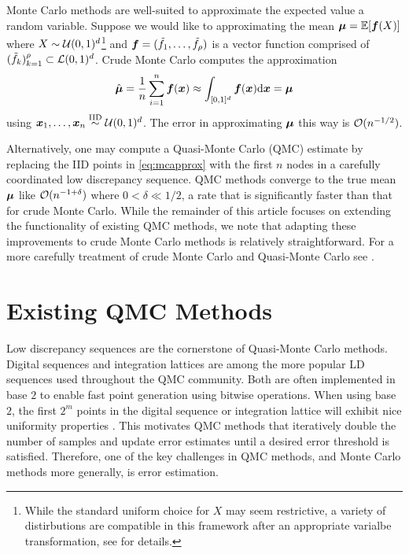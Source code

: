 \documentclass{article}[12pt]
\begin{document}
Monte Carlo methods are well-suited to approximate the expected value a random variable. Suppose we would like to approximating the mean $\bmu = \bbE[\bf(X)]$ where $X\sim\calU(0,1)^d$\footnote{While the standard uniform choice for $X$ may seem restrictive, a variety of distirbutions are compatible in this framework after an appropriate varialbe transformation, see  for details.} and  $\bf = (\tilde{f}_1,\dots,\tilde{f}_\rho)$ is a vector function comprised of $(\tilde{f}_k)_{k=1}^\rho \subset \calL(0,1)^d$.  Crude Monte Carlo computes the approximation 
\begin{equation}
    \label{eq:mcapprox}
    \hat{\bmu} = \frac{1}{n}\sum_{i=1}^n \bf(\bx) \approx \int_{[0,1]^d}\bf(\bx)\D\bx = \bmu
\end{equation}
using $\bx_1,\dots,\bx_n \simiid \calU(0,1)^d$. The error in approximating $\bmu$ this way is $\calO(n^{-1/2})$. 

Alternatively, one may compute a Quasi-Monte Carlo (QMC) estimate by replacing the IID points in \eqref{eq:mcapprox} with the first $n$ nodes in a carefully coordinated low discrepancy sequence. QMC methods converge to the true mean $\bmu$ like $\calO(n^{-1+\delta})$ where $0 < \delta \ll 1/2$, a rate that is significantly faster than that for crude Monte Carlo. While the remainder of this article focuses on extending the functionality of existing QMC methods, we note that adapting these improvements to crude Monte Carlo methods is relatively straightforward. For a more carefully treatment of crude Monte Carlo and Quasi-Monte Carlo see . 

\section{Existing QMC Methods}

Low discrepancy sequences are the cornerstone of Quasi-Monte Carlo methods. Digital sequences and integration lattices are among the more popular LD sequences used throughout the QMC community. Both are often implemented in base $2$ to enable fast point generation using bitwise operations. When using base $2$, the first $2^m$ points in the digital sequence or integration lattice will exhibit nice uniformity properties . This motivates QMC methods that iteratively double the number of samples and update error estimates until a desired error threshold is satisfied. Therefore, one of the key challenges in QMC methods, and Monte Carlo methods more generally, is error estimation.
\end{document}
